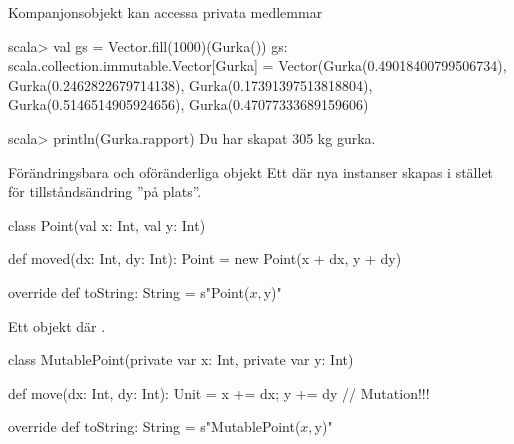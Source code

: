 \begin{Slide}{Kompanjonsobjekt kan accessa privata medlemmar}%
{}
\pause
\begin{REPL}
scala> val gs = Vector.fill(1000)(Gurka())
gs: scala.collection.immutable.Vector[Gurka] = 
  Vector(Gurka(0.49018400799506734), Gurka(0.2462822679714138), Gurka(0.17391397513818804), Gurka(0.5146514905924656), Gurka(0.47077333689159606)

scala> println(Gurka.rapport)
Du har skapat 305 kg gurka.

\end{REPL}

\end{Slide}






\begin{Slide}{Förändringsbara och oföränderliga objekt}
Ett  där nya instanser skapas i stället för tillståndsändring ''på plats''.
\begin{Code}
class Point(val x: Int, val y: Int) {
  def moved(dx: Int, dy: Int): Point = new Point(x + dx, y + dy)

  override def toString: String = s"Point($x, $y)"
}
\end{Code}

Ett  objekt där .
\begin{Code}
class MutablePoint(private var x: Int, private var y: Int) {
  def move(dx: Int, dy: Int): Unit = {x += dx; y += dy}  // Mutation!!!

  override def toString: String = s"MutablePoint($x, $y)"
}
\end{Code}
\end{Slide}


